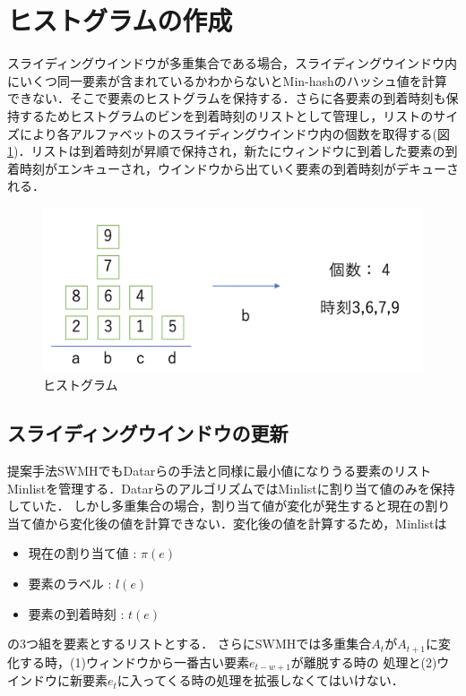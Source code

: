 \section{ヒストグラムの作成}
スライディングウインドウが多重集合である場合，スライディングウインドウ内にいくつ同一要素が含まれているかわからないとMin-hashのハッシュ値を計算できない．そこで要素のヒストグラムを保持する．さらに各要素の到着時刻も保持するためヒストグラムのビンを到着時刻のリストとして管理し，リストのサイズにより各アルファベットのスライディングウインドウ内の個数を取得する(図 \ref{fig:4_3_2})．リストは到着時刻が昇順で保持され，新たにウィンドウに到着した要素の到着時刻がエンキューされ，ウインドウから出ていく要素の到着時刻がデキューされる．
\begin{figure}[H]
  \centering
  \includegraphics[width=15cm]{4_3_2.png}
    \caption{ヒストグラム}
    \label{fig:4_3_2}
\end{figure}
\subsection{スライディングウインドウの更新}
提案手法SWMHでもDatarらの手法と同様に最小値になりうる要素のリストMinlistを管理する．DatarらのアルゴリズムではMinlistに割り当て値のみを保持していた．
しかし多重集合の場合，割り当て値が変化が発生すると現在の割り当て値から変化後の値を計算できない．変化後の値を計算するため，Minlistは
\begin{itemize}
\item 現在の割り当て値 : $\pi(e)$
\item 要素のラベル : $l (e)$
\item 要素の到着時刻 : $t(e)$
\end{itemize}
の3つ組を要素とするリストとする．
さらにSWMHでは多重集合$A_t$が$A_{t+1}$に変化する時，(1)ウィンドウから一番古い要素$e_{t-w+1}$が離脱する時の
処理と(2)ウインドウに新要素$e_t$に入ってくる時の処理を拡張しなくてはいけない．
